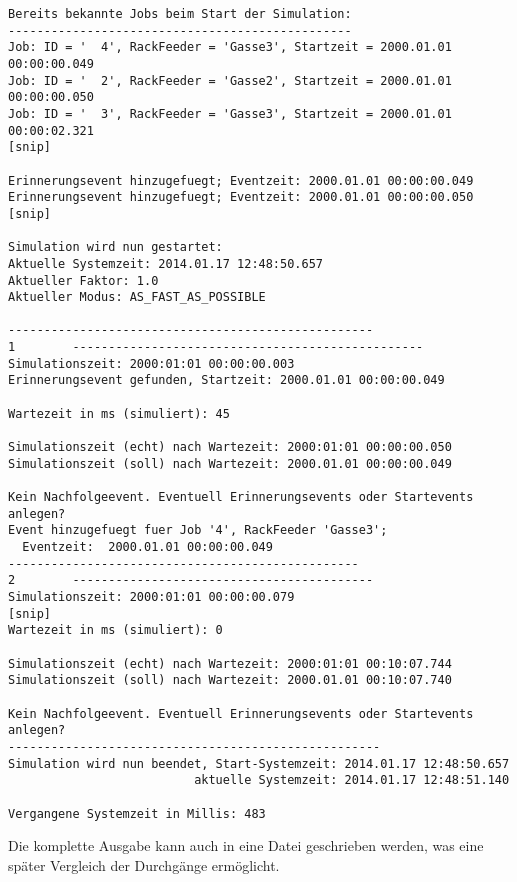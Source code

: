\begin{verbatim}
Bereits bekannte Jobs beim Start der Simulation:
------------------------------------------------
Job: ID = '  4', RackFeeder = 'Gasse3', Startzeit = 2000.01.01 00:00:00.049
Job: ID = '  2', RackFeeder = 'Gasse2', Startzeit = 2000.01.01 00:00:00.050
Job: ID = '  3', RackFeeder = 'Gasse3', Startzeit = 2000.01.01 00:00:02.321
[snip]

Erinnerungsevent hinzugefuegt; Eventzeit: 2000.01.01 00:00:00.049
Erinnerungsevent hinzugefuegt; Eventzeit: 2000.01.01 00:00:00.050
[snip]

Simulation wird nun gestartet:
Aktuelle Systemzeit: 2014.01.17 12:48:50.657
Aktueller Faktor: 1.0
Aktueller Modus: AS_FAST_AS_POSSIBLE

---------------------------------------------------
1        -------------------------------------------------
Simulationszeit: 2000:01:01 00:00:00.003
Erinnerungsevent gefunden, Startzeit: 2000.01.01 00:00:00.049

Wartezeit in ms (simuliert): 45

Simulationszeit (echt) nach Wartezeit: 2000:01:01 00:00:00.050
Simulationszeit (soll) nach Wartezeit: 2000.01.01 00:00:00.049

Kein Nachfolgeevent. Eventuell Erinnerungsevents oder Startevents anlegen?
Event hinzugefuegt fuer Job '4', RackFeeder 'Gasse3'; 
  Eventzeit:  2000.01.01 00:00:00.049
-------------------------------------------------
2        ------------------------------------------
Simulationszeit: 2000:01:01 00:00:00.079
[snip]
Wartezeit in ms (simuliert): 0

Simulationszeit (echt) nach Wartezeit: 2000:01:01 00:10:07.744
Simulationszeit (soll) nach Wartezeit: 2000.01.01 00:10:07.740

Kein Nachfolgeevent. Eventuell Erinnerungsevents oder Startevents anlegen?
----------------------------------------------------
Simulation wird nun beendet, Start-Systemzeit: 2014.01.17 12:48:50.657
                          aktuelle Systemzeit: 2014.01.17 12:48:51.140

Vergangene Systemzeit in Millis: 483
\end{verbatim}
Die komplette Ausgabe kann auch in eine Datei geschrieben werden, was eine später Vergleich der Durchgänge ermöglicht.

